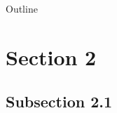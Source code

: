 \documentclass[navbaroff]{sdqbeamer}
\begin{document}
\begin{frame}{Outline}
\end{frame}

\section{Section 2}
\subsection{Subsection 2.1}
\begin{frame}{}
    \centering
    \textbf{}
\end{frame}
\end{document}
